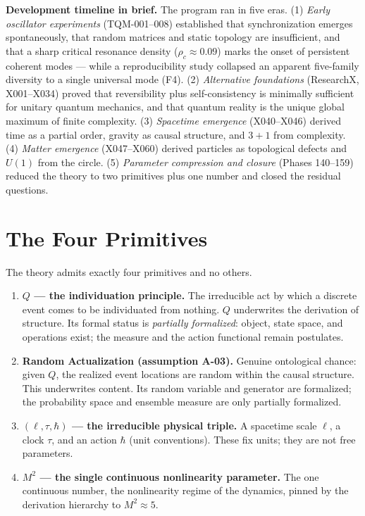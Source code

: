 \documentclass[10pt,a4paper]{article}
\begin{document}
\textbf{Development timeline in brief.} The program ran in five eras. (1) \emph{Early
oscillator experiments} (TQM-001--008) established that synchronization emerges
spontaneously, that random matrices and static topology are insufficient, and that a sharp
critical resonance density ($\rho_c\approx0.09$) marks the onset of persistent coherent
modes --- while a reproducibility study collapsed an apparent five-family diversity to a
single universal mode (F4). (2) \emph{Alternative foundations} (ResearchX, X001--X034)
proved that reversibility plus self-consistency is minimally sufficient for unitary quantum
mechanics, and that quantum reality is the unique global maximum of finite complexity.
(3) \emph{Spacetime emergence} (X040--X046) derived time as a partial order, gravity as
causal structure, and $3{+}1$ from complexity. (4) \emph{Matter emergence} (X047--X060)
derived particles as topological defects and $U(1)$ from the circle. (5) \emph{Parameter
compression and closure} (Phases 140--159) reduced the theory to two primitives plus one
number and closed the residual questions.

\section{The Four Primitives}

The theory admits exactly four primitives and no others.

\begin{enumerate}
\item \textbf{$Q$ --- the individuation principle.} The irreducible act by which a discrete
event comes to be individuated from nothing. $Q$ underwrites the derivation of structure.
Its formal status is \emph{partially formalized}: object, state space, and operations
exist; the measure and the action functional remain postulates.
\item \textbf{Random Actualization (assumption A-03).} Genuine ontological chance: given
$Q$, the realized event locations are random within the causal structure. This underwrites
content. Its random variable and generator are formalized; the probability space and
ensemble measure are only partially formalized.
\item \textbf{$(\ell,\tau,\hbar)$ --- the irreducible physical triple.} A spacetime scale
$\ell$, a clock $\tau$, and an action $\hbar$ (unit conventions). These fix units; they
are not free parameters.
\item \textbf{$M^2$ --- the single continuous nonlinearity parameter.} The one continuous
number, the nonlinearity regime of the dynamics, pinned by the derivation hierarchy to
$M^2\approx 5$.
\end{enumerate}
\end{document}
